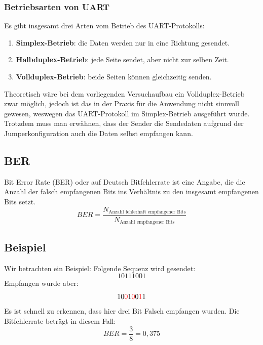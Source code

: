 \subsubsection{Betriebsarten von UART}
Es gibt insgesamt drei Arten vom Betrieb des UART-Protokolls:
\begin{enumerate}
    \item \textbf{Simplex-Betrieb}: die Daten werden nur in eine Richtung gesendet.
    \item \textbf{Halbduplex-Betrieb}: jede Seite sendet, aber nicht zur selben Zeit.
    \item \textbf{Vollduplex-Betrieb}: beide Seiten können gleichzeitig senden.
\end{enumerate}

Theoretisch wäre bei dem vorliegenden Versuchaufbau ein Vollduplex-Betrieb zwar möglich, jedoch ist das in der Praxis für die Anwendung nicht sinnvoll gewesen, weswegen das UART-Protokoll im Simplex-Betrieb ausgeführt wurde.
Trotzdem muss man erwähnen, dass der Sender die Sendedaten aufgrund der Jumperkonfiguration auch die Daten selbst empfangen kann.

\subsection{BER}
Bit Error Rate (BER) oder auf Deutsch Bitfehlerrate ist eine Angabe, die die
Anzahl der falsch empfangenen Bits ins Verhältnis zu den insgesamt empfangenen Bits setzt.
\begin{equation}
    BER = \frac{N_{\text{Anzahl fehlerhaft empfangener Bits}}}{N_{\text{Anzahl empfangener Bits}}}
\end{equation}
\subsection{Beispiel}
Wir betrachten ein Beispiel: Folgende Sequenz wird gesendet:
\begin{equation}
    10111001
\end{equation}
Empfangen wurde aber:
\begin{equation}
      10\textcolor{red}{0}1\textcolor{red}{0}0\textcolor{red}{1}1
\end{equation}
Es ist schnell zu erkennen, dass hier drei Bit Falsch empfangen  wurden.
Die Bitfehlerrate beträgt in diesem Fall:
\begin{equation}
    BER = \frac{3}{8} = 0,375
\end{equation}
